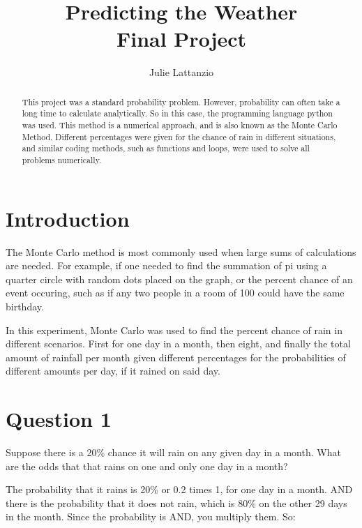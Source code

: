 \documentclass{revtex4}
\begin{document}
\title{Predicting the Weather \\
\large Final Project}

\author{Julie Lattanzio}

\begin{abstract}
    This project was a standard probability problem. However, probability can often take a long time to calculate analytically. So in this case, the programming language python was used. This method is a numerical approach, and is also known as the Monte Carlo Method. Different percentages were given for the chance of rain in different situations, and similar coding methods, such as functions and loops, were used to solve all problems numerically.
\end{abstract}

\maketitle

\section*{Introduction}

The Monte Carlo method is most commonly used when large sums of calculations are needed. For example, if one needed to find the summation of pi using a quarter circle with random dots placed on the graph, or the percent chance of an event occuring, such as if any two people in a room of 100 could have the same birthday.

In this experiment, Monte Carlo was used to find the percent chance of rain in different scenarios. First for one day in a month, then eight, and finally the total amount of rainfall per month given different percentages for the probabilities of different amounts per day, if it rained on said day. 

\section*{Question 1}

Suppose there is a 20\% chance it will rain on any given day in a month. What are the odds that that rains on one and only one day in a month?

The probability that it rains is 20\% or 0.2 times 1, for one day in a month. AND there is the probability that it does not rain, which is 80\% on the other 29 days in the month. Since the probability is AND, you multiply them. So:
\end{document}
